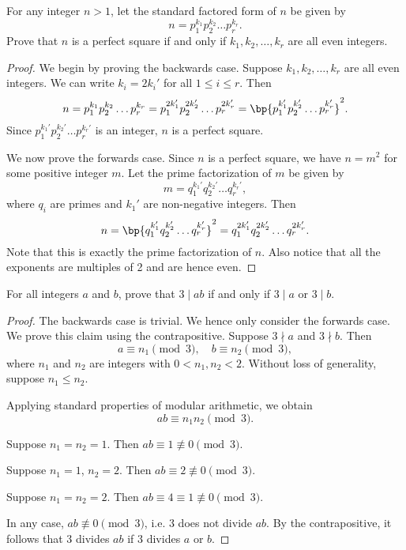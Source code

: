 \begin{problem}
    For any integer $n > 1$, let the standard factored form of $n$ be given by \[n = p_1^{k_1} p_2^{k_2} \dots p_{r}^{k_r}.\] Prove that $n$ is a perfect square if and only if $k_1, k_2, \dots, k_r$ are all even integers.
\end{problem}
\begin{solution}
    \begin{proof}
        We begin by proving the backwards case. Suppose $k_1, k_2, \dots, k_r$ are all even integers. We can write $k_i = 2k_i'$ for all $1 \leq i \leq r$. Then \[n = p_1^{k_1} p_2^{k_2} \dots p_{r}^{k_r} = p_1^{2k_1'} p_2^{2k_2'} \dots p_{r}^{2k_r'} = \bp{p_1^{k_1'} p_2^{k_2'} \dots p_{r}^{k_r'}}^2.\] Since $p_1^{k_1'} p_2^{k_2'} \dots p_{r}^{k_r'}$ is an integer, $n$ is a perfect square.

        We now prove the forwards case. Since $n$ is a perfect square, we have $n = m^2$ for some positive integer $m$. Let the prime factorization of $m$ be given by \[m = q_1^{k_1'} q_2^{k_2'} \dots q_{r}^{k_r'},\] where $q_i$ are primes and $k_1'$ are non-negative integers. Then \[n = \bp{q_1^{k_1'} q_2^{k_2'} \dots q_{r}^{k_r'}}^2 = q_1^{2k_1'} q_2^{2k_2'} \dots q_{r}^{2k_r'}.\] Note that this is exactly the prime factorization of $n$. Also notice that all the exponents are multiples of 2 and are hence even.
    \end{proof}
\end{solution}

\begin{problem}
    For all integers $a$ and $b$, prove that $3 \mid ab$ if and only if $3 \mid a$ or $3 \mid b$.
\end{problem}
\begin{solution}
    \begin{proof}
        The backwards case is trivial. We hence only consider the forwards case. We prove this claim using the contrapositive. Suppose $3 \nmid a$ and $3 \nmid b$. Then \[a \equiv n_1 \pmod{3}, \quad b \equiv n_2 \pmod{3},\] where $n_1$ and $n_2$ are integers with $0 < n_1, n_2 < 2$. Without loss of generality, suppose $n_1 \leq n_2$.
        
        Applying standard properties of modular arithmetic, we obtain \[ab \equiv n_1 n_2 \pmod{3}.\]

         Suppose $n_1 = n_2 = 1$. Then $ab \equiv 1 \not\equiv 0 \pmod{3}$.
        
         Suppose $n_1 = 1$, $n_2 = 2$. Then $ab \equiv 2 \not\equiv 0 \pmod{3}$.

         Suppose $n_1 = n_2 = 2$. Then $ab \equiv 4 \equiv 1 \not\equiv 0 \pmod{3}$.

        In any case, $ab \not\equiv 0 \pmod{3}$, i.e. 3 does not divide $ab$. By the contrapositive, it follows that 3 divides $ab$ if 3 divides $a$ or $b$.
    \end{proof}
\end{solution}

